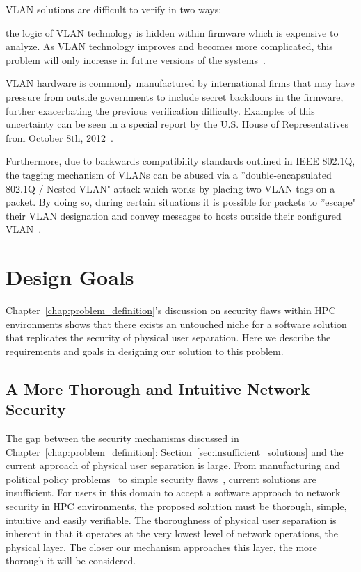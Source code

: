 \documentclass[oneside,12pt]{memoir}
\begin{document}
VLAN solutions are difficult to verify in two ways:
\begin{inparaenum} 
\item the logic of VLAN technology is hidden within firmware which is expensive to analyze. As VLAN technology improves and becomes more complicated, this problem will only increase in future versions of the systems~\cite{emery2011security}\cite{kloth2001derived}.
\item VLAN hardware is commonly manufactured by international firms that may have pressure from outside governments to include secret backdoors in the firmware, further exacerbating the previous verification difficulty. Examples of this uncertainty can be seen in a special report by the U.S. House of Representatives from October 8th, 2012~\cite{huawei}.
\end{inparaenum}

Furthermore, due to backwards compatibility standards outlined in IEEE 802.1Q, the tagging mechanism of VLANs can be abused via a ''double-encapsulated 802.1Q / Nested VLAN" attack which works by placing two VLAN tags on a packet. By doing so, during certain situations it is possible for packets to ''escape" their VLAN designation and convey messages to hosts outside their configured VLAN~\cite{cisco_vlan_whitepaper}.

\chapter{Design Goals}
\label{chap:design_goals}
Chapter~\ref{chap:problem_definition}'s discussion on security flaws within HPC environments shows that there exists an untouched niche for a software solution that replicates the security of physical user separation. Here we describe the requirements and goals in designing our solution to this problem.
\section{A More Thorough and Intuitive Network Security}
The gap between the security mechanisms discussed in Chapter~\ref{chap:problem_definition}: Section~\ref{sec:insufficient_solutions} and the current approach of physical user separation is large. From manufacturing and political policy problems~\cite{huawei} to simple security flaws~\cite{cisco_vlan_whitepaper}, current solutions are insufficient. For users in this domain to accept a software approach to network security in HPC environments, the proposed solution must be thorough, simple, intuitive and easily verifiable. The thoroughness of physical user separation is inherent in that it operates at the very lowest level of network operations, the physical layer. The closer our mechanism approaches this layer, the more thorough it will be considered.
\end{document}
